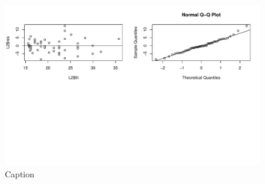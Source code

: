 \documentclass[a4paper,12pt]{article}
\theoremstyle{definition}
\begin{document}
\begin{figure}
    \centering
    \includegraphics{gb/K8G2 (1).pdf}
    \caption{Caption}
    \label{fig:my_label}
\end{figure}
\end{document}
